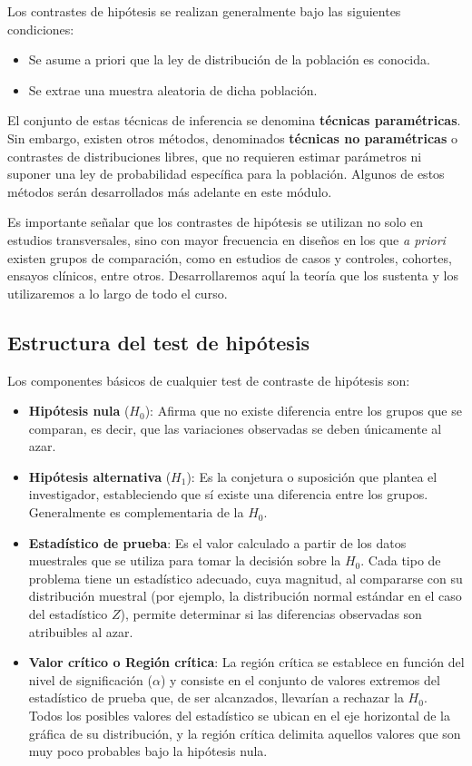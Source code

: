 \documentclass[
  spanish,
  a4paper,
]{scrbook}
\begin{document}
Los contrastes de hipótesis se realizan generalmente bajo las siguientes
condiciones:

\begin{itemize}
\item
  Se asume a priori que la ley de distribución de la población es
  conocida.
\item
  Se extrae una muestra aleatoria de dicha población.
\end{itemize}

El conjunto de estas técnicas de inferencia se denomina \textbf{técnicas
paramétricas}. Sin embargo, existen otros métodos, denominados
\textbf{técnicas no paramétricas} o contrastes de distribuciones libres,
que no requieren estimar parámetros ni suponer una ley de probabilidad
específica para la población. Algunos de estos métodos serán
desarrollados más adelante en este módulo.

Es importante señalar que los contrastes de hipótesis se utilizan no
solo en estudios transversales, sino con mayor frecuencia en diseños en
los que \emph{a priori} existen grupos de comparación, como en estudios
de casos y controles, cohortes, ensayos clínicos, entre otros.
Desarrollaremos aquí la teoría que los sustenta y los utilizaremos a lo
largo de todo el curso.

\subsection{Estructura del test de
hipótesis}\label{estructura-del-test-de-hipuxf3tesis}

Los componentes básicos de cualquier test de contraste de hipótesis son:

\begin{itemize}
\item
  \textbf{Hipótesis nula} (\(H_0\)): Afirma que no existe diferencia
  entre los grupos que se comparan, es decir, que las variaciones
  observadas se deben únicamente al azar.
\item
  \textbf{Hipótesis alternativa} (\(H_1\)): Es la conjetura o suposición
  que plantea el investigador, estableciendo que sí existe una
  diferencia entre los grupos. Generalmente es complementaria de la
  \(H_0\).
\item
  \textbf{Estadístico de prueba}: Es el valor calculado a partir de los
  datos muestrales que se utiliza para tomar la decisión sobre la
  \(H_0\). Cada tipo de problema tiene un estadístico adecuado, cuya
  magnitud, al compararse con su distribución muestral (por ejemplo, la
  distribución normal estándar en el caso del estadístico \(Z\)),
  permite determinar si las diferencias observadas son atribuibles al
  azar.
\item
  \textbf{Valor crítico o Región crítica}: La región crítica se
  establece en función del nivel de significación (\(\alpha\)) y
  consiste en el conjunto de valores extremos del estadístico de prueba
  que, de ser alcanzados, llevarían a rechazar la \(H_0\). Todos los
  posibles valores del estadístico se ubican en el eje horizontal de la
  gráfica de su distribución, y la región crítica delimita aquellos
  valores que son muy poco probables bajo la hipótesis nula.
\end{itemize}
\end{document}
